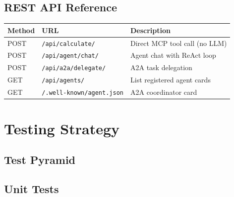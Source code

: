 \documentclass[11pt,a4paper]{article}
\begin{document}
\subsection{REST API Reference}

\begin{center}
\begin{tabularx}{\linewidth}{llX}
\toprule
\textbf{Method} & \textbf{URL} & \textbf{Description} \\
\midrule
POST & \texttt{/api/calculate/}    & Direct MCP tool call (no LLM) \\
POST & \texttt{/api/agent/chat/}   & Agent chat with ReAct loop \\
POST & \texttt{/api/a2a/delegate/} & A2A task delegation \\
GET  & \texttt{/api/agents/}       & List registered agent cards \\
GET  & \texttt{/.well-known/agent.json} & A2A coordinator card \\
\bottomrule
\end{tabularx}
\end{center}

\newpage
\section{Testing Strategy}

\subsection{Test Pyramid}

\begin{center}
\end{center}

\subsection{Unit Tests}
\end{document}
